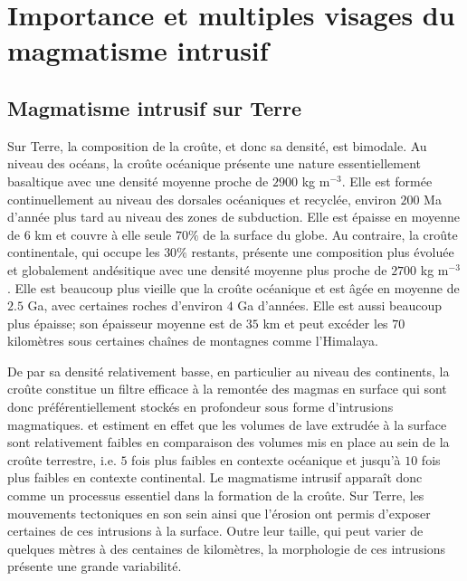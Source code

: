 \section{Importance et multiples visages du magmatisme intrusif}
\label{C1-sec:zool-des-intr}

\subsection{Magmatisme intrusif sur Terre}
\label{C1-sec:definition}

Sur  Terre, la  composition  de la  croûte, et  donc  sa densité,  est
bimodale.  Au niveau  des  océans, la  croûte  océanique présente  une
nature essentiellement  basaltique avec une densité  moyenne proche de
$2900$  kg m$^{-3}$.  Elle est  formée continuellement  au niveau  des
dorsales océaniques et recyclée, environ $200$ Ma d'année plus tard au
niveau des zones de subduction. Elle  est épaisse en moyenne de $6$ km
et couvre à elle seule $70\%$ de la surface du globe. Au contraire, la
croûte  continentale, qui  occupe  les $30\%$  restants, présente  une
composition plus  évoluée et globalement andésitique  avec une densité
moyenne  plus proche  de $2700$  kg m$^{-3}$.  Elle est  beaucoup plus
vieille que  la croûte océanique et  est âgée en moyenne  de $2.5$ Ga,
avec  certaines  roches d'environ  $4$  Ga  d'années. Elle  est  aussi
beaucoup plus  épaisse; son épaisseur moyenne  est de $35$ km  et peut
excéder les $70$ kilomètres sous  certaines chaînes de montagnes comme
l'Himalaya.

De par sa densité relativement basse, en particulier au niveau des
continents, la croûte constitue un filtre efficace à la remontée des
magmas en surface qui sont donc préférentiellement stockés en
profondeur sous forme d'intrusions magmatiques. \citet{Crisp:1984dm}
et \citet{White:2006gr} estiment en effet que les volumes de lave
extrudée à la surface sont relativement faibles en comparaison des
volumes mis en place au sein de la croûte terrestre, i.e. $5$ fois
plus faibles en contexte océanique et jusqu'à $10$ fois plus faibles
en contexte continental. Le magmatisme intrusif apparaît donc comme
un processus essentiel dans la formation de la croûte. Sur Terre, les
mouvements tectoniques en son sein ainsi que l'érosion ont permis
d'exposer certaines de ces intrusions à la surface. Outre leur
taille, qui peut varier de quelques mètres à des centaines de
kilomètres, la morphologie de ces intrusions présente une grande
variabilité.


